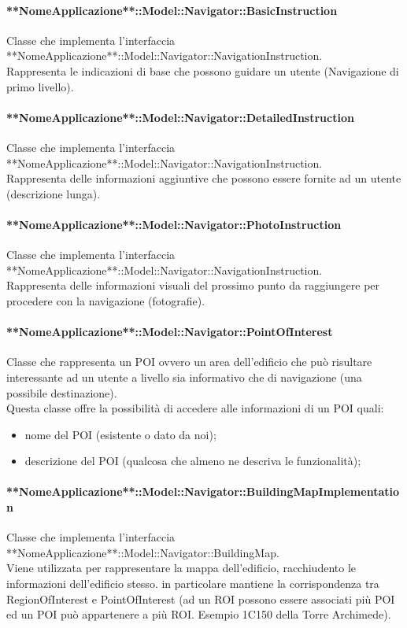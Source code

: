 \documentclass[../SpecificaTecnica.tex]{subfiles}
\begin{document}
				\paragraph{**NomeApplicazione**::Model::Navigator::BasicInstruction}
					Classe che implementa l'interfaccia\\ **NomeApplicazione**::Model::Navigator::NavigationInstruction. \\
					Rappresenta le indicazioni di base che possono guidare un utente (Navigazione di primo livello).
				\paragraph{**NomeApplicazione**::Model::Navigator::DetailedInstruction}
					Classe che implementa l'interfaccia\\ **NomeApplicazione**::Model::Navigator::NavigationInstruction. \\
					Rappresenta delle informazioni aggiuntive che possono essere fornite ad un utente (descrizione lunga).
				\paragraph{**NomeApplicazione**::Model::Navigator::PhotoInstruction}
					Classe che implementa l'interfaccia\\ **NomeApplicazione**::Model::Navigator::NavigationInstruction. \\
					Rappresenta delle informazioni visuali del prossimo punto da raggiungere per procedere con la navigazione (fotografie).
				\paragraph{**NomeApplicazione**::Model::Navigator::PointOfInterest}
					Classe che rappresenta un POI ovvero un area dell'edificio che può risultare interessante ad un utente a livello sia informativo che di navigazione (una possibile destinazione). \\
					Questa classe offre la possibilità di accedere alle informazioni di un POI quali:
					\begin{itemize}
						\item nome del POI (esistente o dato da noi);
						\item descrizione del POI (qualcosa che almeno ne descriva le funzionalità);
					\end{itemize}
				\paragraph{**NomeApplicazione**::Model::Navigator::BuildingMapImplementation}
					Classe che implementa l'interfaccia **NomeApplicazione**::Model::Navigator::BuildingMap. \\
					Viene utilizzata per rappresentare la mappa dell'edificio, racchiudento le informazioni dell'edificio stesso. in particolare mantiene la corrispondenza tra RegionOfInterest e PointOfInterest (ad un ROI possono essere associati più POI ed un POI può appartenere a più ROI. Esempio 1C150 della Torre Archimede). 
\end{document}

